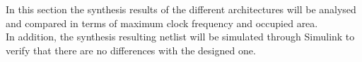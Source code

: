 In this section the synthesis results of the different architectures will be analysed and compared in terms of maximum clock frequency and occupied area.\\
In addition, the synthesis resulting netlist will be simulated through Simulink to verify that there are no differences with the designed one.